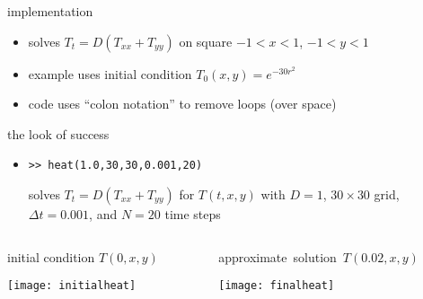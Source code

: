 \begin{frame}{implementation}
\label{slide:heatmatlab}


\small
\begin{itemize}
\item solves $T_t = D(T_{xx} + T_{yy})$ on square $-1 < x < 1$, $-1 < y < 1$
\item example uses initial condition $T_0(x,y) = e^{-30 r^2}$
\item code uses ``colon notation'' to remove loops (over space)
\end{itemize}
\end{frame}


\begin{frame}{the look of success}

\begin{itemize}
\item \texttt{>>  heat(1.0,30,30,0.001,20)}

\medskip
solves $T_t = D(T_{xx} + T_{yy})$ for $T(t,x,y)$ with $D=1$, $30\times 30$ grid, $\Delta t = 0.001$, and $N=20$ time steps
\end{itemize}

\bigskip
\begin{columns}
\begin{column}{0.5\textwidth}
initial condition $T(0,x,y)$

\bigskip
\begin{center}
\texttt{[image: initialheat]}
\end{center}
\end{column}
\begin{column}{0.5\textwidth}
\mbox{approximate solution $T(0.02,x,y)$}

\bigskip
\begin{center}
\texttt{[image: finalheat]}
\end{center}
\end{column}
\end{columns}
\end{frame}


